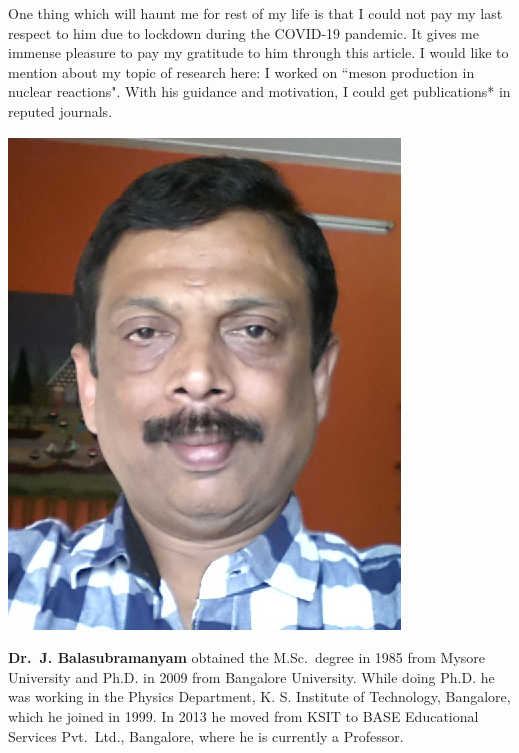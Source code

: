 One thing which will haunt me for rest of my life is that I could not pay my last respect to him due to lockdown during the COVID-19 pandemic. It gives me immense pleasure to pay my gratitude to him through this article. I would like to mention about my topic of research here: I worked on ``meson production in nuclear reactions". With his guidance and motivation, I could get publications* in reputed journals. 
\vskip 1cm


\centerline{\includegraphics[scale=0.8]{authorsphotos/J_Balasubramanyam.eps}}
\medskip

\noindent
\textbf{Dr.\ J. Balasubramanyam} obtained the M.Sc.\ degree in 1985 from Mysore University and Ph.D. in 2009 from Bangalore University. While doing Ph.D. he was working in the Physics Department, K. S. Institute of Technology, Bangalore, which he joined in 1999. In 2013 he moved from KSIT to BASE Educational Services Pvt.\ Ltd., Bangalore, where he is currently a Professor.

